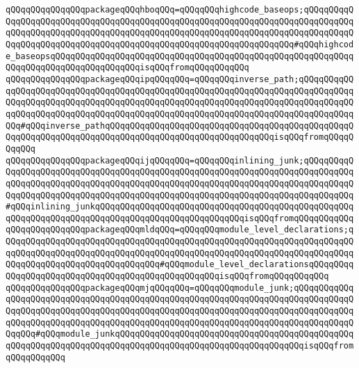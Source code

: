 \verb|qQQqqQQqqQQqqQQqpackageqQQqhboqQQq=qQQqqQQqhighcode_baseops;qQQqqQQqqQQqqQQqqQQqqQQqqQQqqQQqqQQqqQQqqQQqqQQqqQQqqQQqqQQqqQQqqQQqqQQqqQQqqQQqqQQqqQQqqQQqqQQqqQQqqQQqqQQqqQQqqQQqqQQqqQQqqQQqqQQqqQQqqQQqqQQqqQQqqQQqqQQqqQQqqQQqqQQqqQQqqQQqqQQqqQQqqQQqqQQqqQQqqQQqqQQqqQQq#qQQqhighcode_baseopsqQQqqQQqqQQqqQQqqQQqqQQqqQQqqQQqqQQqqQQqqQQqqQQqqQQqqQQqqQQqqQQqqQQqqQQqqQQqqQQqqQQqqQQqisqQQqfromqQQqqQQqqQQq|\newline
\verb|qQQqqQQqqQQqqQQqpackageqQQqipqQQqqQQq=qQQqqQQqinverse_path;qQQqqQQqqQQqqQQqqQQqqQQqqQQqqQQqqQQqqQQqqQQqqQQqqQQqqQQqqQQqqQQqqQQqqQQqqQQqqQQqqQQqqQQqqQQqqQQqqQQqqQQqqQQqqQQqqQQqqQQqqQQqqQQqqQQqqQQqqQQqqQQqqQQqqQQqqQQqqQQqqQQqqQQqqQQqqQQqqQQqqQQqqQQqqQQqqQQqqQQqqQQqqQQqqQQqqQQqqQQqqQQq#qQQqinverse_pathqQQqqQQqqQQqqQQqqQQqqQQqqQQqqQQqqQQqqQQqqQQqqQQqqQQqqQQqqQQqqQQqqQQqqQQqqQQqqQQqqQQqqQQqqQQqqQQqqQQqqQQqisqQQqfromqQQqqQQqqQQq|\newline
\verb|qQQqqQQqqQQqqQQqpackageqQQqijqQQqqQQq=qQQqqQQqinlining_junk;qQQqqQQqqQQqqQQqqQQqqQQqqQQqqQQqqQQqqQQqqQQqqQQqqQQqqQQqqQQqqQQqqQQqqQQqqQQqqQQqqQQqqQQqqQQqqQQqqQQqqQQqqQQqqQQqqQQqqQQqqQQqqQQqqQQqqQQqqQQqqQQqqQQqqQQqqQQqqQQqqQQqqQQqqQQqqQQqqQQqqQQqqQQqqQQqqQQqqQQqqQQqqQQqqQQqqQQqqQQq#qQQqinlining_junkqQQqqQQqqQQqqQQqqQQqqQQqqQQqqQQqqQQqqQQqqQQqqQQqqQQqqQQqqQQqqQQqqQQqqQQqqQQqqQQqqQQqqQQqqQQqqQQqqQQqisqQQqfromqQQqqQQqqQQq|\newline
\verb|qQQqqQQqqQQqqQQqpackageqQQqmldqQQq=qQQqqQQqmodule_level_declarations;qQQqqQQqqQQqqQQqqQQqqQQqqQQqqQQqqQQqqQQqqQQqqQQqqQQqqQQqqQQqqQQqqQQqqQQqqQQqqQQqqQQqqQQqqQQqqQQqqQQqqQQqqQQqqQQqqQQqqQQqqQQqqQQqqQQqqQQqqQQqqQQqqQQqqQQqqQQqqQQqqQQqqQQqqQQq#qQQqmodule_level_declarationsqQQqqQQqqQQqqQQqqQQqqQQqqQQqqQQqqQQqqQQqqQQqqQQqqQQqisqQQqfromqQQqqQQqqQQq|\newline
\verb|qQQqqQQqqQQqqQQqpackageqQQqmjqQQqqQQq=qQQqqQQqmodule_junk;qQQqqQQqqQQqqQQqqQQqqQQqqQQqqQQqqQQqqQQqqQQqqQQqqQQqqQQqqQQqqQQqqQQqqQQqqQQqqQQqqQQqqQQqqQQqqQQqqQQqqQQqqQQqqQQqqQQqqQQqqQQqqQQqqQQqqQQqqQQqqQQqqQQqqQQqqQQqqQQqqQQqqQQqqQQqqQQqqQQqqQQqqQQqqQQqqQQqqQQqqQQqqQQqqQQqqQQqqQQqqQQqqQQq#qQQqmodule_junkqQQqqQQqqQQqqQQqqQQqqQQqqQQqqQQqqQQqqQQqqQQqqQQqqQQqqQQqqQQqqQQqqQQqqQQqqQQqqQQqqQQqqQQqqQQqqQQqqQQqqQQqqQQqisqQQqfromqQQqqQQqqQQq|\newline
